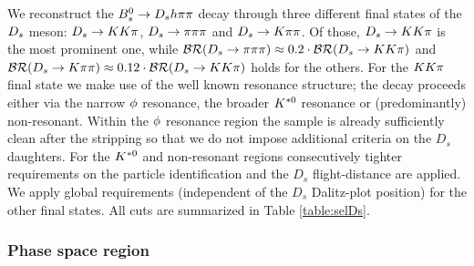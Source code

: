 We reconstruct the ${{B}^0_{s}}\rightarrow{\ensuremath{{D}_{s}}} h{\pi}{\pi}$ decay through three different final states of the ${{D}_{s}}$ meson: ${{D}_{s}}\rightarrow{\ensuremath{K}}{\ensuremath{K}}{\ensuremath{\pi}}$, ${{D}_{s}}\rightarrow{\ensuremath{\pi}}{\ensuremath{\pi}}{\ensuremath{\pi}}$ and ${{D}_{s}}\rightarrow{\ensuremath{K}}{\ensuremath{\pi}}{\ensuremath{\pi}}$.
Of those, ${{D}_{s}}\rightarrow{\ensuremath{K}}{\ensuremath{K}}{\ensuremath{\pi}}$ is the most prominent one,
while $\mathcal{BR}({{D}_{s}}\rightarrow{\ensuremath{\pi}}{\ensuremath{\pi}}{\ensuremath{\pi}}) \approx 0.2\cdot\mathcal{BR}({{D}_{s}}\rightarrow{\ensuremath{K}}{\ensuremath{K}}{\ensuremath{\pi}})$ and $\mathcal{BR}({{D}_{s}}\rightarrow{\ensuremath{K}}{\ensuremath{\pi}}{\ensuremath{\pi}}) \approx 0.12\cdot\mathcal{BR}({{D}_{s}}\rightarrow{\ensuremath{K}}{\ensuremath{K}}{\ensuremath{\pi}})$ holds for the others. 
For the ${K}{K}{\pi}$  final state we make use of the well known resonance structure;
the decay proceeds either via the narrow $\phi$ resonance, the broader ${{K}^{*0}}$ resonance or (predominantly) non-resonant.
Within the $\phi$ resonance region the sample is already sufficiently clean after the stripping so that we do not impose additional criteria on the $D_s$ daughters.
For the ${{K}^{*0}}$ and non-resonant regions consecutively tighter requirements on the particle identification and the $D_s$ flight-distance are applied. 
We apply global requirements (\ie independent of the $D_s$ Dalitz-plot position) for the other final states. All cuts are summarized in Table \ref{table:selDs}.


%
%
 
 \subsubsection{Phase space region}
 \label{ssec:phasespace}

